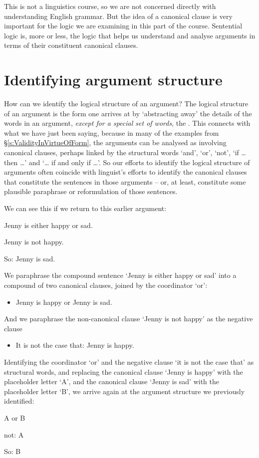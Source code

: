 This is not a linguistics course, so we are not concerned directly with understanding English grammar. But the idea of a canonical clause is very important for the logic we are examining in this part of the course. Sentential logic is, more or less, the logic that helps us understand and analyse arguments in terms of their constituent canonical clauses. 

\section{Identifying argument structure}\label{ss.idargstr}

How can we identify the logical structure of an argument? The logical structure of an argument is the form one arrives at by `abstracting away' the details of the words in an argument, \emph{except for a special set of words}, the . This connects with what we have just been saying, because in many of the examples from §\ref{s:ValidityInVirtueOfForm}, the arguments can be analysed as involving canonical clauses, perhaps linked by the structural words `and', `or', `not', `if … then …' and `… if and only if …'. So our efforts to identify the logical structure of arguments often coincide with linguist's efforts to identify the canonical clauses that constitute the sentences in those arguments – or, at least, constitute some plausible paraphrase or reformulation of those sentences.

We can see this if we return to this earlier argument: \begin{earg}
	\item[] Jenny is either happy or sad.
	\item[] Jenny is not happy.
	\item[So:] Jenny is sad.
\end{earg}
We paraphrase the compound sentence `Jenny is either happy or sad' into a compound of two canonical clauses, joined by the coordinator `or':
\begin{itemize}
\item Jenny is happy or Jenny is sad.
\end{itemize} 
And we paraphrase the non-canonical clause `Jenny is not happy' as the negative clause 
\begin{itemize}
	\item It is not the case that: Jenny is happy.

	\end{itemize} Identifying the coordinator `or' and the negative clause `it is not the case that' as structural words, and replacing the canonical clause `Jenny is happy' with the placeholder letter `A', and the canonical clause `Jenny is sad' with the placeholder letter `B', we arrive again at the argument structure we previously identified:
	\begin{earg}
		\item[] A \textsf{or} B
		\item[] \textsf{not}: A
		\item[So:] B
	\end{earg}

